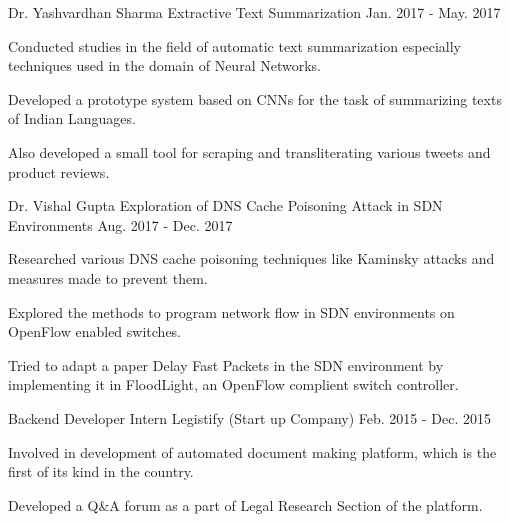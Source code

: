 

\begin{cventries}

  \cventry
    {Dr. Yashvardhan Sharma} %
    {Extractive Text Summarization} %
    {} %
    {Jan. 2017 - May. 2017} %
    {
      \begin{cvitems} %
        \item {Conducted studies in the field of automatic text summarization especially techniques used in the domain of Neural Networks.}
        \item {Developed a prototype system based on CNNs for the task of summarizing texts of Indian Languages.}
        \item{Also developed a small tool for scraping and transliterating various tweets and product reviews.}
      \end{cvitems}
    }
 
  \cventry
    {Dr. Vishal Gupta} %
    {Exploration of DNS Cache Poisoning Attack in SDN Environments} %
    {} %
    {Aug. 2017 - Dec. 2017} %
    {
      \begin{cvitems} %
        \item {Researched various DNS cache poisoning techniques like Kaminsky attacks and measures made to prevent them.}
        \item {Explored the methods to program network flow in SDN environments on OpenFlow enabled switches.}
        \item {Tried to adapt a paper Delay Fast Packets in the SDN environment by implementing it in FloodLight, an OpenFlow complient switch controller.}
      \end{cvitems}
    }


\cventry
    {Backend Developer Intern} %
    {Legistify (Start up Company)} %
    {} %
    {Feb. 2015 - Dec. 2015} %
    {
      \begin{cvitems} %
        \item {Involved in development of automated document making platform, which is the first of its kind in the country.}
        \item {Developed a Q\&A forum as a part of Legal Research Section of the platform.}
      \end{cvitems}
    }


\end{cventries}
